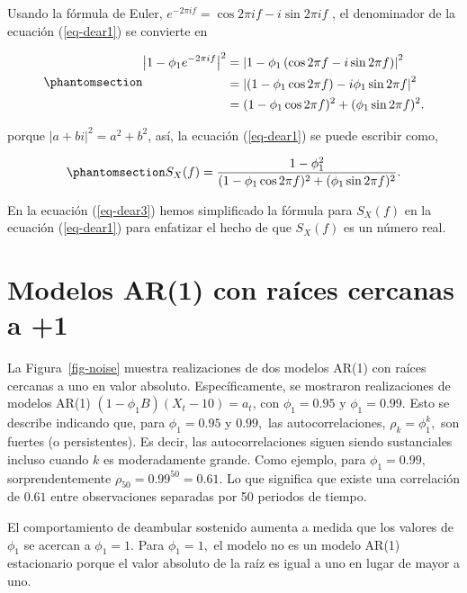\documentclass[
  us-letterpaper,
]{scrreprt}
\theoremstyle{plain}
\theoremstyle{definition}
\theoremstyle{definition}
\theoremstyle{remark}
\begin{document}
Usando la fórmula de Euler,
\(e^{-2\pi if} = \cos 2 \pi if - i \sin 2\pi if\) , el denominador de la
ecuación (\ref{eq-dear1}) se convierte en

\begin{equation}\phantomsection\label{eq-dear2}{
\begin{split}
  \left| 1 - \phi_1 e^{-2 \pi i f} \right|^2 &= \left| 1 - \phi_1 \left( \cos 2 \pi f - i \sin 2 \pi f     \right) \right|^2\\
  &= \left| (1 - \phi_1 \cos 2 \pi f) - i \phi_1 \sin 2 \pi f \right|^2\\
  &= (1 - \phi_1 \cos 2 \pi f)^2 + (\phi_1 \sin 2 \pi f)^2.
\end{split}
}\end{equation}

porque \(|a + bi|^2 = a^2 + b^2\), así, la ecuación (\ref{eq-dear1}) se
puede escribir como,

\begin{equation}\phantomsection\label{eq-dear3}{
S_X(f) = \frac{1 - \phi_1^2}{(1 - \phi_1 \cos 2 \pi f)^2 + (\phi_1 \sin 2 \pi f)^2}.
}\end{equation}

En la ecuación (\ref{eq-dear3}) hemos simplificado la fórmula para
\(S_X (f )\) en la ecuación (\ref{eq-dear1}) para enfatizar el hecho de
que \(S_X( f)\) es un número real.

\section{Modelos AR(1) con raíces cercanas a
+1}\label{modelos-ar1-con-rauxedces-cercanas-a-1}

La Figura~\ref{fig-noise} muestra realizaciones de dos modelos AR(1) con
raíces cercanas a uno en valor absoluto. Específicamente, se mostraron
realizaciones de modelos AR(1) \((1 - \phi_1 B)(X_t - 10) = a_t\), con
\(\phi_1 = 0.95\) y \(\phi_1 = 0.99.\) Esto se describe indicando que,
para \(\phi_1 = 0.95\) y \(0.99,\) las autocorrelaciones,
\(\rho_k = \phi_1^k,\) son fuertes (o persistentes). Es decir, las
autocorrelaciones siguen siendo sustanciales incluso cuando \(k\) es
moderadamente grande. Como ejemplo, para \(\phi_1 = 0.99,\)
sorprendentemente \(\rho_{50} = 0.99^{50} = 0.61.\) Lo que significa que
existe una correlación de \(0.61\) entre observaciones separadas por 50
periodos de tiempo.

El comportamiento de deambular sostenido aumenta a medida que los
valores de \(\phi_1\) se acercan a \(\phi_1 = 1.\) Para \(\phi_1 = 1,\)
el modelo no es un modelo AR(1) estacionario porque el valor absoluto de
la raíz es igual a uno en lugar de mayor a uno.
\end{document}
